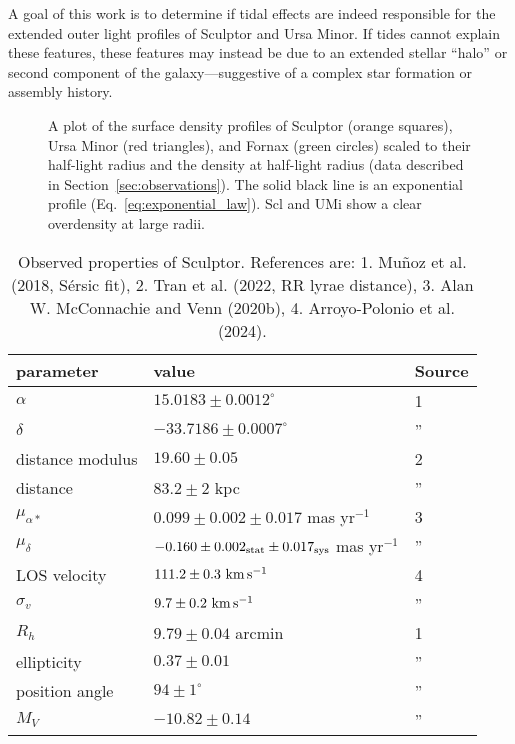A goal of this work is to determine if tidal effects are indeed
responsible for the extended outer light profiles of Sculptor and Ursa
Minor. If tides cannot explain these features, these features may
instead be due to an extended stellar ``halo'' or second component of
the galaxy---suggestive of a complex star formation or assembly history.

\begin{figure}
\centering
{}
\caption[Scl and UMi have an extended density profile]{A plot of the
surface density profiles of Sculptor (orange squares), Ursa Minor (red
triangles), and Fornax (green circles) scaled to their half-light radius
and the density at half-light radius (data described in
Section~\ref{sec:observations}). The solid black line is an exponential
profile (Eq.~\ref{eq:exponential_law}). Scl and UMi show a clear
overdensity at large radii.}\label{fig:scl_umi_vs_fornax}
\end{figure}

\begin{table*}[t]
\centering
\caption[Observed Properties of Sculptor]{Observed properties of Sculptor. References are: 1. Muñoz et al. (2018, Sérsic fit), 2. Tran et al. (2022, RR lyrae distance), 3. Alan W. McConnachie and Venn (2020b), 4. Arroyo-Polonio et al. (2024). }
\label{tbl:scl_obs_props}
\begin{tabular}{lll}
\toprule
parameter & value & Source\\
\midrule
$\alpha$ & $15.0183 \pm 0.0012^\circ$ & 1\\
$\delta$ & $-33.7186 \pm 0.0007^\circ$ & ”\\
distance modulus & $19.60 \pm 0.05$ & 2\\
distance & $83.2 \pm 2$ kpc & ”\\
$\mu_{\alpha*}$ & $0.099 \pm 0.002 \pm 0.017$ mas yr$^{-1}$ & 3\\
$\mu_\delta$ & $-0.160 \pm 0.002_{\rm stat} \pm 0.017_{\rm sys}$ mas yr$^{-1}$ & ”\\
LOS velocity & $111.2 \pm 0.3\ {\rm km\,s^{-1}}$ & 4\\
$\sigma_v$ & $9.7\pm0.2\ {\rm km\,s^{-1}}$ & ”\\
$R_h$ & $9.79 \pm 0.04$ arcmin & 1\\
ellipticity & $0.37 \pm 0.01$ & ”\\
position angle & $94\pm1^\circ$ & ”\\
$M_V$ & $-10.82\pm0.14$ & ”\\
\bottomrule
\end{tabular}
\end{table*}

